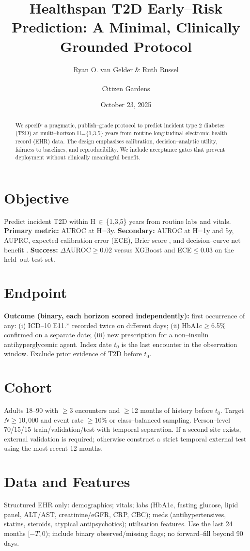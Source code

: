 \documentclass[11pt]{article}
\title{Healthspan T2D Early--Risk Prediction: A Minimal, Clinically Grounded Protocol}
\author{Ryan O. van Gelder \& Ruth Russel \\ \\ Citizen Gardens}
\date{October 23, 2025}
\begin{document}
\maketitle

\begin{abstract}
We specify a pragmatic, publish--grade protocol to predict incident type 2 diabetes (T2D) at multi--horizon H=\{1,3,5\} years from routine longitudinal electronic health record (EHR) data. The design emphasises calibration, decision--analytic utility, fairness to baselines, and reproducibility. We include acceptance gates that prevent deployment without clinically meaningful benefit.
\end{abstract}

\section{Objective}
Predict incident T2D within H\,$\in$\,\{1,3,5\} years from routine labs and vitals. \textbf{Primary metric:} AUROC at H=3y. \textbf{Secondary:} AUROC at H=1y and 5y, AUPRC, expected calibration error (ECE), Brier score \citep{brier1950verification}, and decision--curve net benefit \citep{vickers2006decision}. \textbf{Success:} $\Delta$AUROC$\ge0.02$ versus XGBoost \citep{chen2016xgboost} and ECE$\le0.03$ on the held--out test set.

\section{Endpoint}
\textbf{Outcome (binary, each horizon scored independently):} first occurrence of any: (i) ICD--10 E11.* recorded twice on different days; (ii) HbA1c$\ge$6.5\% confirmed on a separate date; (iii) new prescription for a non--insulin antihyperglycemic agent. Index date $t_0$ is the last encounter in the observation window. Exclude prior evidence of T2D before $t_0$.

\section{Cohort}
Adults 18--90 with $\ge$3 encounters and $\ge$12 months of history before $t_0$. Target $N\ge10{,}000$ and event rate $\ge10\%$ or class--balanced sampling. Person--level 70/15/15 train/validation/test with temporal separation. If a second site exists, external validation is required; otherwise construct a strict temporal external test using the most recent 12 months.

\section{Data and Features}
Structured EHR only: demographics; vitals; labs (HbA1c, fasting glucose, lipid panel, ALT/AST, creatinine/eGFR, CRP, CBC); meds (antihypertensives, statins, steroids, atypical antipsychotics); utilisation features. Use the last 24 months [$-T,0$); include binary observed/missing flags; no forward--fill beyond 90 days.
\end{document}
